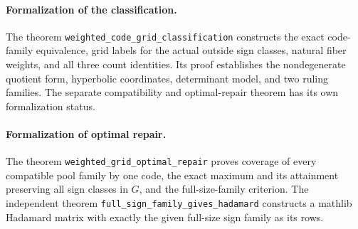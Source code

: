 \paragraph{Formalization of the classification.} The theorem \texttt{weighted\_\allowbreak code\_\allowbreak grid\_\allowbreak classification} constructs the exact code-family equivalence, grid labels for the actual outside sign classes, natural fiber weights, and all three count identities. Its proof establishes the nondegenerate quotient form, hyperbolic coordinates, determinant model, and two ruling families. The separate compatibility and optimal-repair theorem has its own formalization status.

\paragraph{Formalization of optimal repair.} The theorem \texttt{weighted\_\allowbreak grid\_\allowbreak optimal\_\allowbreak repair} proves coverage of every compatible pool family by one code, the exact maximum and its attainment preserving all sign classes in $G$, and the full-size-family criterion. The independent theorem \texttt{full\_\allowbreak sign\_\allowbreak family\_\allowbreak gives\_\allowbreak hadamard} constructs a mathlib Hadamard matrix with exactly the given full-size sign family as its rows.

